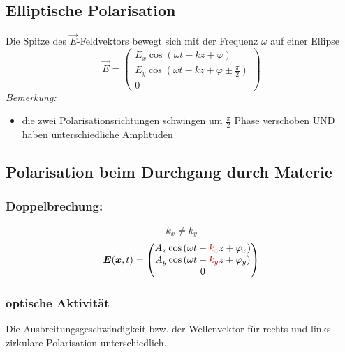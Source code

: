 \subsection{Elliptische Polarisation}

Die Spitze des $ \vec{E} $-Feldvektors bewegt sich mit der Frequenz $ \omega $ auf einer Ellipse
\begin{equation*}
\vec{E} = \begin{pmatrix}
E_x \cos(\omega t - k z + \varphi) \\
E_y \cos(\omega t - k z + \varphi \pm \frac{\pi}{2}) \\
0
\end{pmatrix}
\end{equation*}
\emph{Bemerkung:}
\begin{itemize}
	\item die zwei Polarisationsrichtungen schwingen um $ \frac{\pi}{2} $ Phase verschoben UND haben unterschiedliche Amplituden
\end{itemize}

\subsection{Polarisation beim Durchgang durch Materie}

\subsubsection{Doppelbrechung:}

\begin{equation*}
k_x \neq k_y
\end{equation*}
\begin{equation*}
\vec{E}(\vec{x},t) = \begin{pmatrix}
A_x \cos\left(\omega t - \color{black!30!red}k_x\color{black}z + \varphi_x\right) \\ A_y \cos\left(\omega t - \color{black!30!red}k_y\color{black}z + \varphi_y \right) \\ 0
\end{pmatrix}
\end{equation*}

\subsubsection{optische Aktivität}

Die Ausbreitungsgeschwindigkeit bzw. der Wellenvektor für rechts und links zirkulare Polarisation unterschiedlich.

